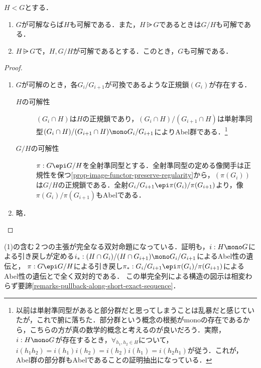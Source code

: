 \documentclass[uplatex,dvipdfmx]{jsreport}
\begin{document}
\begin{proposition}[可解性の遺伝]
    $H< G$とする．
    \begin{enumerate}
        \item $G$が可解ならば$H$も可解である．また，$H\rsub G$であるときは$G/H$も可解である．
        \item $H\rsub G$で，$H,G/H$が可解であるとする．このとき，$G$も可解である．
    \end{enumerate}
\end{proposition}
\begin{proof}\mbox{}
    \begin{enumerate}
        \item $G$が可解のとき，各$G_i/G_{i+1}$が可換であるような正規鎖$(G_i)$が存在する．
        \begin{description}
            \item[$H$の可解性] $(G_i\cap H)$は$H$の正規鎖であり，$(G_i\cap H)/(G_{i+1}\cap H)$は単射準同型$(G_i\cap H)/(G_{i+1}\cap H)\mono G_i/G_{i+1}$によりAbel群である．\footnote{以前は単射準同型があると部分群だと思ってしまうことは乱暴だと感じていたが，これで腑に落ちた．部分群という概念の根拠がmonoの存在であるから，こちらの方が真の数学的概念と考えるのが良いだろう．実際，$i:H\mono G$が存在するとき，$\forall_{h_1,h_2\in H}$について，$i(h_1h_2)=i(h_1)i(h_2)=i(h_2)i(h_1)=i(h_2h_1)$が従う．これが，Abel群の部分群もAbelであることの証明抽出になっている．}
            \item[$G/H$の可解性] $\pi:G\epi G/H$を全射準同型とする．全射準同型の定める像関手は正規性を保つ\ref{prop-image-functor-preserve-regularity}から，$(\pi(G_i))$は$G/H$の正規鎖である．全射$G_i/G_{i+1}\epi\pi(G_i)/\pi(G_{i+1})$より，像$\pi(G_i)/\pi(G_{i+1})$もAbelである．
        \end{description}
        \item 略．
    \end{enumerate}
\end{proof}
\begin{remarks}
    (1)の含む２つの主張が完全なる双対命題になっている．証明も，$i:H\mono G$による引き戻しが定める$i_*:(H\cap G_i)/(H\cap G_{i+1})\mono G_i/G_{i+1}$によるAbel性の遺伝と，
    $\pi:G\epi G/H$による引き戻し$\pi_*:G_i/G_{i+1}\epi\pi(G_i)/\pi(G_{i+1})$によるAbel性の遺伝とで全く双対的である．
    この単完全列による構造の図示は相変わらず要諦\ref{remarks-pullback-along-short-exact-sequence}．
\end{remarks}
\end{document}
